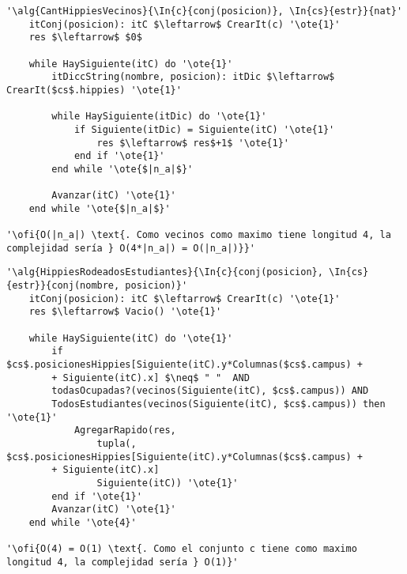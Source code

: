 \begin{lstlisting}[mathescape]
'\alg{CantHippiesVecinos}{\In{c}{conj(posicion)}, \In{cs}{estr}}{nat}'
	itConj(posicion): itC $\leftarrow$ CrearIt(c) '\ote{1}'
	res $\leftarrow$ $0$
	
	while HaySiguiente(itC) do '\ote{1}'
		itDiccString(nombre, posicion): itDic $\leftarrow$ CrearIt($cs$.hippies) '\ote{1}'
		
		while HaySiguiente(itDic) do '\ote{1}'
			if Siguiente(itDic) = Siguiente(itC) '\ote{1}'
				res $\leftarrow$ res$+1$ '\ote{1}'
			end if '\ote{1}'
		end while '\ote{$|n_a|$}'

		Avanzar(itC) '\ote{1}'
	end while '\ote{$|n_a|$}'

'\ofi{O(|n_a|) \text{. Como vecinos como maximo tiene longitud 4, la complejidad sería } O(4*|n_a|) = O(|n_a|)}}'
\end{lstlisting}

\begin{lstlisting}[mathescape]
'\alg{HippiesRodeadosEstudiantes}{\In{c}{conj(posicion}, \In{cs}{estr}}{conj(nombre, posicion)}'
	itConj(posicion): itC $\leftarrow$ CrearIt(c) '\ote{1}'
	res $\leftarrow$ Vacio() '\ote{1}'

	while HaySiguiente(itC) do '\ote{1}'
		if $cs$.posicionesHippies[Siguiente(itC).y*Columnas($cs$.campus) +
		+ Siguiente(itC).x] $\neq$ " "  AND 
		todasOcupadas?(vecinos(Siguiente(itC), $cs$.campus)) AND 
		TodosEstudiantes(vecinos(Siguiente(itC), $cs$.campus)) then '\ote{1}'
			AgregarRapido(res, 
				tupla(, $cs$.posicionesHippies[Siguiente(itC).y*Columnas($cs$.campus) +
		+ Siguiente(itC).x] 
				Siguiente(itC)) '\ote{1}'
		end if '\ote{1}'
		Avanzar(itC) '\ote{1}'
	end while '\ote{4}'

'\ofi{O(4) = O(1) \text{. Como el conjunto c tiene como maximo longitud 4, la complejidad sería } O(1)}'
\end{lstlisting}

